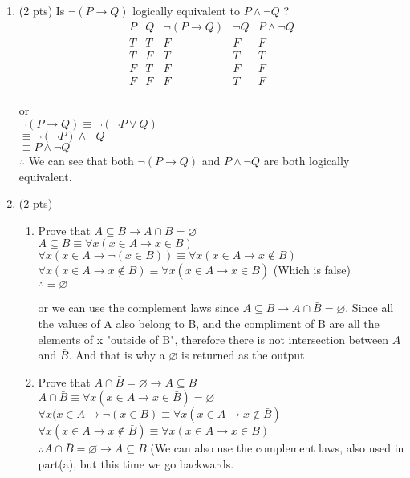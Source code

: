 \documentclass[12pt]{article}
\let\emptyset\varnothing
\begin{document}
\begin{enumerate}
\item  (2 pts) Is \(\neg (P \rightarrow Q )\) logically equivalent to \(P \wedge \neg Q\)  ?
    \begin{displaymath}
    \begin{array}{|c|c|c|c|c|}
    P & Q & \lnot (P \rightarrow Q) & \lnot Q & P \land \lnot Q\\
    \hline
      T & T & F & F & F\\
      T & F & T & T & T\\
      F & T & F & F & F\\
      F & F & F & T & F

    \end{array}
    \end{displaymath}
    \\or
    \\ $\lnot (P \rightarrow Q) \equiv \lnot (\lnot P \lor Q)$
    \\$\equiv \lnot(\lnot P) \land \lnot Q$
    \\$\equiv P \land \lnot Q$
    \\$\therefore$ We can see that both $\lnot (P \rightarrow Q)$ and $P \land \lnot Q$ are both logically equivalent.
\item  (2 pts)
\begin{enumerate}
	\item  Prove that \(A \subseteq B \to A \cap \bar{B} = \emptyset\)
\\$A \subseteq B \equiv \forall x (x \in A \rightarrow x \in B)$
\\$\forall x (x \in A \rightarrow \lnot(x \in B))\equiv \forall x (x \in A \rightarrow x \not \in B)$
\\$\forall x (x \in A \rightarrow x \not \in B) \equiv \forall x (x \in A \rightarrow x \in \bar{B})$ (Which is false)
\\$\therefore \equiv \emptyset$

or we can use the complement laws since $A \subseteq B \rightarrow A \cap \bar{B} = \emptyset$. Since all the values of A also belong to B, and the compliment of B are all the elements of x "outside of B", therefore there is not intersection between $A$  and $\bar{B}$. And that is why a $\emptyset$ is returned as the output.\\
\item Prove that \(A \cap \bar{B} = \emptyset \to A \subseteq B\)
    \\$A \cap \bar{B} \equiv \forall x (x \in A \rightarrow x \in \bar{B}) = \emptyset$
    \\$\forall x (x \in A \rightarrow \lnot(x \in B) \equiv \forall x (x \in A \rightarrow x \not \in \bar{B})$
    \\$\forall x (x \in A \rightarrow x \not \in \bar{B}) \equiv \forall x (x \in A \rightarrow x \in B)$
    \\$\therefore A \cap \bar{B} = \emptyset \rightarrow A \subseteq B$ (We can also use the complement laws, also used in part(a), but this time we go backwards.


\end{enumerate}
\end{enumerate}
\end{document}

